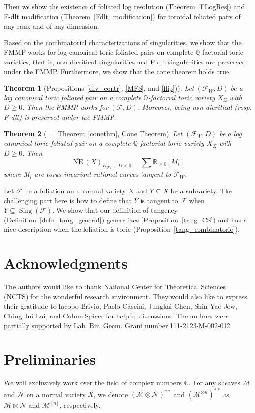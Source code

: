 \documentclass[12pt,reqno]{amsart}
\newtheorem{theorem}{Theorem}[section]
\theoremstyle{definition}
\newcommand{\mc}{\mathcal}
\newcommand{\on}{\operatorname}
\newcommand\cF{{\mathcal{F}}}
\newcommand\cM{{\mathcal{M}}}
\newcommand\cN{{\mathcal{N}}}
\newcommand\bC{{\mathbb C}}
\newcommand\bQ{{\mathbb Q}}
\newcommand\bR{{\mathbb R}}
\begin{document}
Then we show the existence of foliated log resolution (Theorem~\ref{FLogRes}) and F-dlt modification (Theorem~\ref{Fdlt_modification}) for toroidal foliated pairs of any rank and of any dimension.

Based on the combinatorial characterizations of singularities, we show that the FMMP works for log canonical toric foliated pairs on complete $\bQ$-factorial toric varieties, that is, non-dicritical singularities and F-dlt singularities are preserved under the FMMP. Furthermore, we show that the cone theorem holds true.

\begin{theorem}[{Propositions~\ref{div_contr}, \ref{MFS}, and \ref{flip})}]
    Let $(\cF_W,D)$ be a log canonical toric foliated pair on a complete $\bQ$-factorial toric variety $X_\Sigma$ with $D\geq 0$. 
    Then the FMMP works for $(\cF,D)$. 
    Moreover, being non-dicritical (resp. F-dlt) is preserved under the FMMP. 
\end{theorem}

\begin{theorem}[{$=$ Theorem~\ref{conethm}, Cone Theorem}]
    Let $(\cF_W,D)$ be a log canonical toric foliated pair on a complete $\bQ$-factorial toric variety $X_\Sigma$ with $D\geq 0$. 
    Then 
    \[\overline{\on{NE}}(X)_{K_{\cF_W}+D<0} = \sum\bR_{\geq 0}[M_i]\] 
    where $M_i$ are torus invariant rational curves tangent to $\cF_W$. 
\end{theorem}
Let $\mc F$ be a foliation on a normal variety $X$ and $Y\subseteq X$ be a subvariety.
The challenging part here is how to define that $Y$  is tangent to $\mc F$ when $Y\subseteq\on{Sing}(\mc F)$. We show that our definition of tangency (Definition~\ref{defn_tang_general}) generalizes \cite[Definition 2.12]{CS} (Proposition~\ref{tang_CS}) and has a nice description when the foliation is toric (Proposition~\ref{tang_combinatoric}). 

\section*{Acknowledgments}
The authors would like to thank National Center for Theoretical Sciences (NCTS) for the wonderful research environment. 
They would also like to express their gratitude to Iacopo Brivio, Paolo Cascini, Jungkai Chen, Shin-Yao Jow, Ching-Jui Lai, and Calum Spicer for helpful discussions. 
The authors were partially supported by Lab. Bir. Geom. Grant number 111-2123-M-002-012. 

\section{Preliminaries}\label{sec:preliminaries}
We will exclusively work over the field of complex numbers $\bC$. 
For any sheaves $\cM$ and $\cN$ on a normal variety $X$, we denote $(\cM\otimes\cN)^{**}$ and $(\cM^{\otimes n})^{**}$ as $\cM\boxtimes\cN$ and $\cM^{[n]}$, respectively. 
\end{document}
